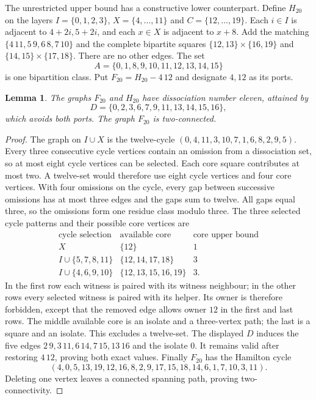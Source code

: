 \documentclass[11pt]{article}
\newtheorem{lemma}[theorem]{Lemma}
\begin{document}
The unrestricted upper bound has a constructive lower counterpart. Define
$H_{20}$ on the layers $I=\{0,1,2,3\}$, $X=\{4,\ldots,11\}$ and
$C=\{12,\ldots,19\}$. Each $i\in I$ is adjacent to $4+2i,5+2i$, and
each $x\in X$ is adjacent to $x+8$. Add the matching
$\{4\,11,5\,9,6\,8,7\,10\}$ and the complete bipartite squares
$\{12,13\}\times\{16,19\}$ and $\{14,15\}\times\{17,18\}$.
There are no other edges. The set
\[
 A=\{0,1,8,9,10,11,12,13,14,15\}
\]
is one bipartition class. Put $F_{20}=H_{20}-4\,12$ and designate
$4,12$ as its ports.

\begin{lemma}\label{lem:twenty-block}
The graphs $F_{20}$ and $H_{20}$ have dissociation number eleven, attained by
\[
 D=\{0,2,3,6,7,9,11,13,14,15,16\},
\]
which avoids both ports. The graph $F_{20}$ is two-connected.
\end{lemma}
\begin{proof}
The graph on $I\cup X$ is the twelve-cycle
$(0,4,11,3,10,7,1,6,8,2,9,5)$. Every three consecutive cycle vertices
contain an omission from a dissociation set, so at most eight cycle
vertices can be selected. Each core square contributes at most two.
A twelve-set would therefore use eight cycle vertices and four core vertices.
With four omissions on the cycle, every gap between successive omissions
has at most three edges and the gaps sum to twelve. All gaps equal three,
so the omissions form one residue class modulo three. The three selected
cycle patterns and their possible core vertices are
\[
\begin{array}{c|c|c}
\text{cycle selection}&\text{available core}&\text{core upper bound}\\\hline
X&\{12\}&1\\
I\cup\{5,7,8,11\}&\{12,14,17,18\}&3\\
I\cup\{4,6,9,10\}&\{12,13,15,16,19\}&3.
\end{array}
\]
In the first row each witness is paired with its witness neighbour;
in the other rows every selected witness is paired with its helper.
Its owner is therefore forbidden, except that the removed edge allows
owner $12$ in the first and last rows. The middle available core is an isolate and
a three-vertex path; the last is a square and an isolate. This excludes
a twelve-set. The displayed $D$ induces the five edges
$2\,9,3\,11,6\,14,7\,15,13\,16$ and the isolate $0$.
It remains valid after restoring $4\,12$, proving both exact values.
Finally $F_{20}$ has the Hamilton cycle
\[
 (4,0,5,13,19,12,16,8,2,9,17,15,18,14,6,1,7,10,3,11).
\]
Deleting one vertex leaves a connected spanning path, proving two-connectivity.
\end{proof}
\end{document}
